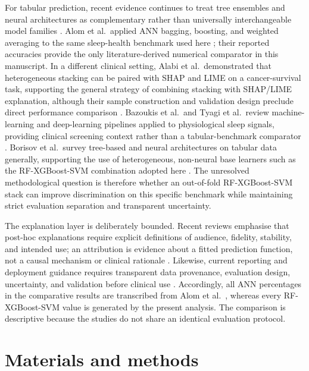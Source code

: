 \documentclass{turkjour}%
\begin{document}
For tabular prediction, recent evidence continues to treat tree ensembles and neural architectures as complementary rather than universally interchangeable model families \cite{Borisov2024}. Alom et al.\ applied ANN bagging, boosting, and weighted averaging to the same sleep-health benchmark used here \cite{Alom2024}; their reported accuracies provide the only literature-derived numerical comparator in this manuscript. In a different clinical setting, Alabi et al.\ demonstrated that heterogeneous stacking can be paired with SHAP and LIME on a cancer-survival task, supporting the general strategy of combining stacking with SHAP/LIME explanation, although their sample construction and validation design preclude direct performance comparison \cite{Alabi2023}. Bazoukis et al.\ and Tyagi et al.\ review machine-learning and deep-learning pipelines applied to physiological sleep signals, providing clinical screening context rather than a tabular-benchmark comparator \cite{Bazoukis2023, Tyagi2023}. Borisov et al.\ survey tree-based and neural architectures on tabular data generally, supporting the use of heterogeneous, non-neural base learners such as the RF-XGBoost-SVM combination adopted here \cite{Borisov2024}. The unresolved methodological question is therefore whether an out-of-fold RF-XGBoost-SVM stack can improve discrimination on this specific benchmark while maintaining strict evaluation separation and transparent uncertainty.

The explanation layer is deliberately bounded. Recent reviews emphasise that post-hoc explanations require explicit definitions of audience, fidelity, stability, and intended use; an attribution is evidence about a fitted prediction function, not a causal mechanism or clinical rationale \cite{Jung2023, Allen2024}. Likewise, current reporting and deployment guidance requires transparent data provenance, evaluation design, uncertainty, and validation before clinical use \cite{CollinsTRIPOD2024, Lekadir2025}. Accordingly, all ANN percentages in the comparative results are transcribed from Alom et al.\ \cite{Alom2024}, whereas every RF-XGBoost-SVM value is generated by the present analysis. The comparison is descriptive because the studies do not share an identical evaluation protocol.

\section{Materials and methods}
\end{document}
